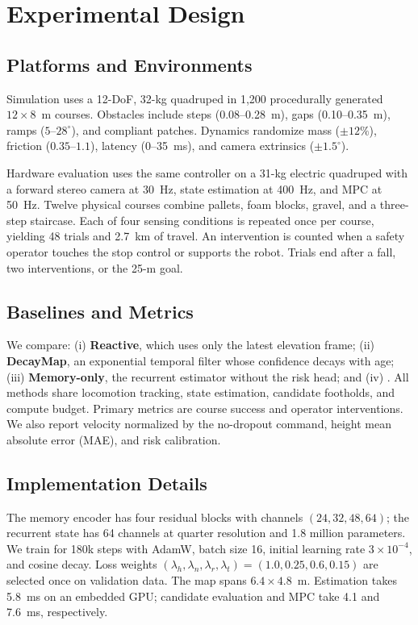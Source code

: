 \section{Experimental Design}

\subsection{Platforms and Environments}

Simulation uses a 12-DoF, 32-kg quadruped in 1,200 procedurally generated $12\times8$~m
courses. Obstacles include steps (0.08--0.28~m), gaps (0.10--0.35~m), ramps
($5$--$28^{\circ}$), and compliant patches. Dynamics randomize mass ($\pm12\%$), friction
($0.35$--$1.1$), latency (0--35~ms), and camera extrinsics ($\pm1.5^{\circ}$).

Hardware evaluation uses the same controller on a 31-kg electric quadruped with a forward
stereo camera at 30~Hz, state estimation at 400~Hz, and MPC at 50~Hz. Twelve physical
courses combine pallets, foam blocks, gravel, and a three-step staircase. Each of four
sensing conditions is repeated once per course, yielding 48 trials and 2.7~km of travel.
An intervention is counted when a safety operator touches the stop control or supports the
robot. Trials end after a fall, two interventions, or the 25-m goal.

\subsection{Baselines and Metrics}

We compare: (i) \textbf{Reactive}, which uses only the latest elevation frame;
(ii) \textbf{DecayMap}, an exponential temporal filter whose confidence decays with age;
(iii) \textbf{Memory-only}, the recurrent estimator without the risk head; and
(iv) \method{}. All methods share locomotion tracking, state estimation, candidate
footholds, and compute budget. Primary metrics are course success and operator
interventions. We also report velocity normalized by the no-dropout command, height mean
absolute error (MAE), and risk calibration.

\subsection{Implementation Details}

The memory encoder has four residual blocks with channels $(24,32,48,64)$; the recurrent
state has 64 channels at quarter resolution and 1.8 million parameters. We train for 180k
steps with AdamW, batch size 16, initial learning rate $3\times10^{-4}$, and cosine decay.
Loss weights $(\lambda_h,\lambda_n,\lambda_r,\lambda_t)=(1.0,0.25,0.6,0.15)$ are selected
once on validation data. The map spans $6.4\times4.8$~m. Estimation takes 5.8~ms on an
embedded GPU; candidate evaluation and MPC take 4.1 and 7.6~ms, respectively.
